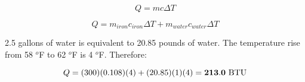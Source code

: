 $$Q = mc \Delta T$$ 
 
$$Q = m_{iron}c_{iron} \Delta T + m_{water}c_{water} \Delta T$$ 

2.5 gallons of water is equivalent to 20.85 pounds of water.  The temperature rise from 58 $^{o}$F to 62 $^{o}$F is 4 $^{o}$F.  Therefore:

$$Q = (300)(0.108)(4)+ (20.85)(1)(4) = {\bf 213.0 \hbox{ BTU}}$$ 


 











